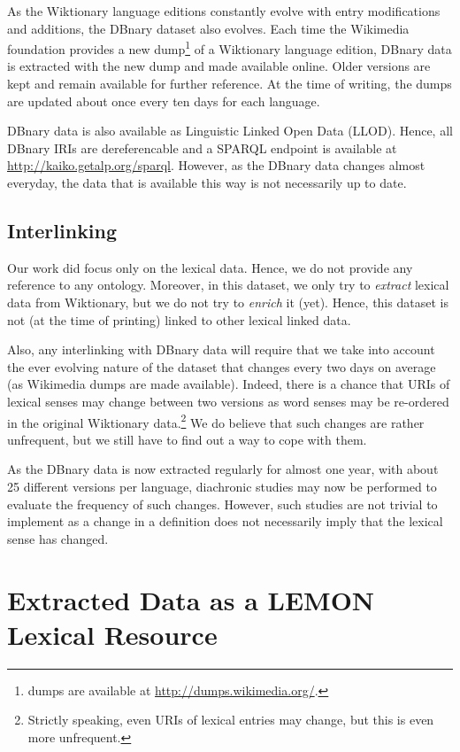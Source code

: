 \documentclass[sw]{iosart2c}
\begin{document}
As the Wiktionary language editions constantly evolve with entry modifications and additions, the DBnary dataset also evolves. Each time the Wikimedia foundation provides a new dump\footnote{dumps are available at \url{http://dumps.wikimedia.org/}.} of a Wiktionary language edition, DBnary data is extracted with the new dump and made available online. Older versions are kept and remain available for further reference. At the time of writing, the dumps are updated about once every ten days for each language. 

DBnary data is also available as Linguistic Linked Open Data (LLOD). Hence, all DBnary IRIs are dereferencable and a SPARQL endpoint is available at \url{http://kaiko.getalp.org/sparql}. However, as the DBnary data changes almost everyday, the data that is available this way is not necessarily up to date.

\subsection{Interlinking}

Our work did focus only on the lexical data. Hence, we do not provide any reference to any ontology. Moreover, in this dataset, we only try to \emph{extract} lexical data from Wiktionary, but we do not try to \emph{enrich} it (yet). Hence, this dataset is not (at the time of printing) linked to other lexical linked data. 

Also, any interlinking with DBnary data will require that we take into account the ever evolving nature of the dataset that changes every two days on average (as Wikimedia dumps are made available). Indeed, there is a chance that URIs of lexical senses may change between two versions as word senses may be re-ordered in the original Wiktionary data.\footnote{Strictly speaking, even URIs of lexical entries may change, but this is even more unfrequent.} We do believe that such changes are rather unfrequent, but we still have to find out a way to cope with them. 

As the DBnary data is now extracted regularly for almost one year, with about 25 different versions per language, diachronic studies may now be performed to evaluate the frequency of such changes. However, such studies are not trivial to implement as a change in a definition does not necessarily imply that the lexical sense has changed.

\section{Extracted Data as a LEMON Lexical Resource}
\end{document}
